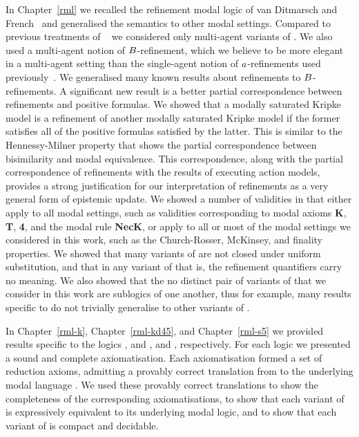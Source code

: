 In Chapter~\ref{rml} we recalled the refinement modal logic of van Ditmarsch and French~\cite{vanditmarsch:2009} and generalised the semantics to other modal settings.
Compared to previous treatments of \logicRml{}~\cite{vanditmarsch:2009,vanditmarsch:2010,bozzelli:2014a} we considered only multi-agent variants of \logicRml{}. 
We also used a multi-agent notion of $B$-refinement, which we believe to be more elegant in a multi-agent setting than the single-agent notion of $a$-refinements used previously~\cite{vanditmarsch:2010}.
We generalised many known results about refinements to $B$-refinements.
A significant new result is a better partial correspondence between refinements and positive formulas.
We showed that a modally saturated Kripke model is a refinement of another modally saturated Kripke model if the former satisfies all of the positive formulas satisfied by the latter.
This is similar to the Hennessy-Milner property that shows the partial correspondence between bisimilarity and modal equivalence.
This correspondence, along with the partial correspondence of refinements with the results of executing action models, provides a strong justification for our interpretation of refinements as a very general form of epistemic update.
We showed a number of validities in \logicRml{} that either apply to all modal settings, such as validities corresponding to modal axioms {\bf K}, {\bf T}, {\bf 4}, and the modal rule {\bf NecK}, or apply to all or most of the modal settings we considered in this work, such as the Church-Rosser, McKinsey, and finality properties.
We showed that many variants of \logicRml{} are not closed under uniform substitution, and that in any variant of \logicRml{} that is, the refinement quantifiers carry no meaning.
We also showed that the no distinct pair of variants of \logicRml{} that we consider in this work are sublogics of one another, thus for example, many results specific to \logicRmlK{} do not trivially generalise to other variants of \logicRml{}.

In Chapter~\ref{rml-k}, Chapter~\ref{rml-kd45}, and Chapter~\ref{rml-s5} we provided results specific to the logics \logicRmlK{}, \logicRmlKFF{} and \logicRmlKD{}, and \logicRmlS{}, respectively.
For each logic we presented a sound and complete axiomatisation.
Each axiomatisation formed a set of reduction axioms, admitting a provably correct translation from \langRml{} to the underlying modal language \langMl{}.
We used these provably correct translations to show the completeness of the corresponding axiomatisations, to show that each variant of \logicRml{} is expressively equivalent to its underlying modal logic, and to show that each variant of \logicRml{} is compact and decidable.

